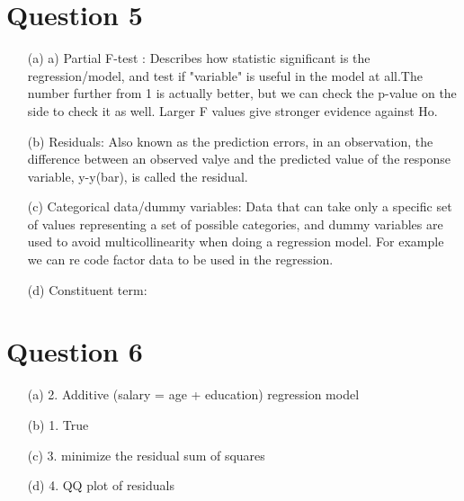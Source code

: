 \documentclass[12pt,letterpaper]{article}
\begin{document}
\section*{Question 5}
\vspace{.5cm}
\begin{enumerate}
	
	\item [(a)] a) Partial F-test : Describes how statistic significant is the regression/model, and test if "variable" is useful in the model at all.The number further from 1 is actually better, but we can check the p-value on the side to check it as well. Larger F values give stronger evidence against Ho. 
	
	
	\item [(b)] Residuals: Also known as the prediction errors, in an observation, the difference between an observed valye and the 
	predicted value of the response variable, y-y(bar), is called the residual. 
	
	
	
	\item [(c)] Categorical data/dummy variables: Data that can take only a specific set of values representing a set of possible categories, and dummy variables are used to avoid multicollinearity when doing a regression model. For example we can re code factor data to be used in the regression. 
		
	\item [(d)] Constituent term: 
	
\end{enumerate}

	\section*{Question 6}
	\vspace{.5cm}
	\begin{enumerate}
		
		\item [(a)] 2. Additive (salary = age + education) regression model
		
		\item [(b)] 1. True
		
		\item [(c)] 3. minimize the residual sum of squares
		
		\item [(d)] 4. QQ plot of residuals
		
	\end{enumerate}
	
\end{document}
